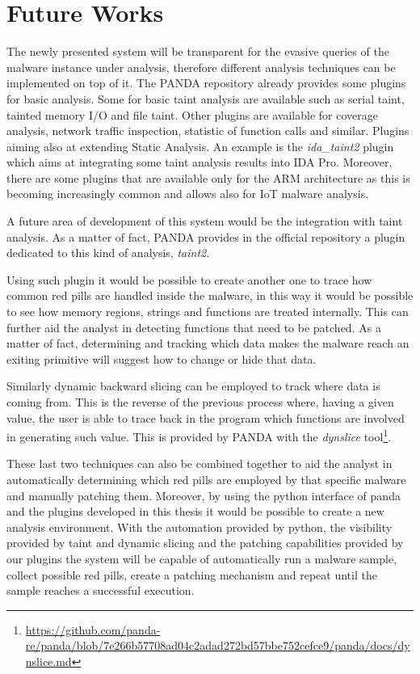 \section{Future Works}

The newly presented system will be transparent for the evasive queries of the malware instance under analysis, therefore different analysis techniques can be implemented on top of it. The PANDA repository already provides some plugins for basic analysis. Some for basic taint analysis are available such as serial taint, tainted memory I/O and file taint. Other plugins are available for coverage analysis, network traffic inspection, statistic of function calls and similar. Plugins aiming also at extending Static Analysis. An example is the \textit{ida\_taint2} plugin which aims at integrating some taint analysis results into IDA Pro. Moreover, there are some plugins that are available only for the ARM architecture as this is becoming increasingly common and allows also for IoT malware analysis. 

A future area of development of this system would be the integration with taint analysis. As a matter of fact, PANDA provides in the official repository a plugin dedicated to this kind of analysis, \textit{taint2}. 

Using such plugin it would be possible to create another one to trace how common red pills are handled inside the malware, in this way it would be possible to see how memory regions, strings and functions are treated internally. This can further aid the analyst in detecting functions that need to be patched. As a matter of fact, determining and tracking which data makes the malware reach an exiting primitive will suggest how to change or hide that data. 

Similarly dynamic backward slicing can be employed to track where data is coming from. This is the reverse of the previous process where, having a given value, the user is able to trace back in the program which functions are involved in generating such value. This is provided by PANDA with the \textit{dynslice} tool\footnote{\url{https://github.com/panda-re/panda/blob/7e266b57708ad04c2adad272bd57bbe752cefce9/panda/docs/dynslice.md}}.

These last two techniques can also be combined together to aid the analyst in automatically determining which red pills are employed by that specific malware and manually patching them. Moreover, by using the python interface of panda and the plugins developed in this thesis it would be possible to create a new analysis environment. With the automation provided by python, the visibility provided by taint and dynamic slicing and the patching capabilities provided by our plugins the system will be capable of automatically run a malware sample, collect possible red pills, create a patching mechanism and repeat until the sample reaches a successful execution.  

